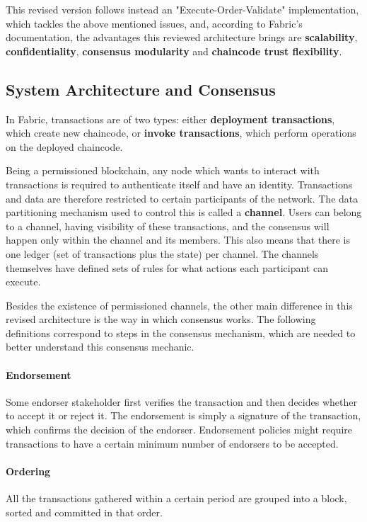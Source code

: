 This revised version follows instead an "Execute-Order-Validate" implementation, which tackles the above mentioned issues, and, according to Fabric's documentation, the advantages this reviewed architecture brings are \textbf{scalability}, \textbf{confidentiality}, \textbf{consensus modularity} and \textbf{chaincode trust flexibility}.

\subsection{System Architecture and Consensus}
\label{hyperledger_architecture}
In Fabric, transactions are of two types: either \textbf{deployment transactions}, which create new chaincode, or \textbf{invoke transactions}, which perform operations on the deployed chaincode. 

Being a permissioned blockchain, any node which wants to interact with transactions is required to authenticate itself and have an identity. Transactions and data are therefore restricted to certain participants of the network. The data partitioning mechanism used to control this is called a \textbf{channel}. Users can belong to a channel, having visibility of these transactions, and the consensus will happen only within the channel and its members. This also means that there is one ledger (set of transactions plus the state) per channel. The channels themselves have defined sets of rules for what actions each participant can execute.

Besides the existence of permissioned channels, the other main difference in this revised architecture is the way in which consensus works. The following definitions correspond to steps in the consensus mechanism, which are needed to better understand this consensus mechanic.

\paragraph{Endorsement} Some endorser stakeholder first verifies the transaction and then decides whether to accept it or reject it. The endorsement is simply a signature of the transaction, which confirms the decision of the endorser. Endorsement policies might require transactions to have a certain minimum number of endorsers to be accepted.

\paragraph{Ordering} All the transactions gathered within a certain period are grouped into a block, sorted and committed in that order.

